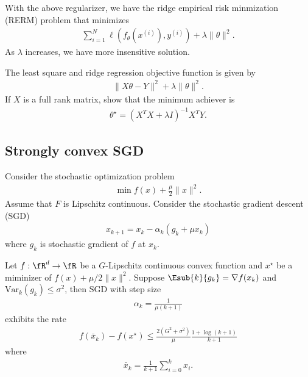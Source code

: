 \documentclass{article}
\begin{document}
With the above regularizer, we have the ridge empirical risk minmization (RERM) problem that minimizes
\begin{align}
    \sum_{i=1}^N \ell(f_\theta(x^{(i)}), y^{(i)}) + \lambda \|\theta\|^2.
\end{align}
As $\lambda$ increases, we have more insensitive solution.
    

\begin{exercise}
    The least square and ridge regression objective function is given by
    \begin{align}
        \|X\theta - Y\|^2 + \lambda \|\theta\|^2.
    \end{align}
    If $X$ is a full rank matrix, show that the minimum achiever is
    \begin{align}
        \theta^\star = (X^TX+\lambda I)^{-1}X^T Y.
    \end{align}
\end{exercise}

\subsection{Strongly convex SGD}
Consider the stochastic optimization problem
\begin{align}
    \min f(x) + \frac{\mu}{2} \|x\|^2.
\end{align}
Assume that $F$ is Lipschitz continuous.
Consider the stochastic gradient descent (SGD)
\begin{align}
    x_{k+1} = x_k - \alpha_k (g_k + \mu x_k)
\end{align}
where $g_k$ is stochastic gradient of $f$ at $x_k$.

\begin{theorem}
    Let $f:\fR^d\rightarrow \fR$ be a $G$-Lipschitz continuous convex function and $x^\star$ be a miminizer of $f(x) + \mu/2 \|x\|^2$.
    Suppose $\Esub{k}{g_k} = \nabla f(x_k)$ and $\mbox{Var}_k(g_k)\leq \sigma^2$, then SGD with step size
    \begin{align}
        \alpha_k = \frac{1}{\mu (k+1)}
    \end{align}
    exhibits the rate
    \begin{align}
        f(\bar{x}_k)-f(x^\star) \leq \frac{2(G^2+\sigma^2)}{\mu} \frac{1+\log (k+1)}{k+1}
    \end{align}
    where 
    \begin{align}
        \bar{x}_k = \frac{1}{k+1}\sum_{i=0}^k x_i.
    \end{align}
\end{theorem}
\end{document}
